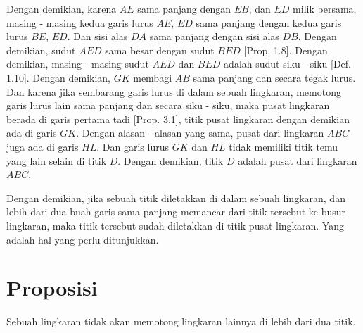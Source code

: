 \documentclass[a4paper]{book}
\begin{document}
Dengan demikian, karena $AE$ sama panjang dengan $EB$, dan $ED$ milik bersama, masing - 
masing kedua garis lurus $AE$, $ED$ sama panjang dengan kedua garis lurus $BE$,
$ED$. Dan sisi alas $DA$ sama panjang dengan sisi alas $DB$. Dengan demikian,
sudut $AED$ sama besar dengan sudut $BED$ [Prop. 1.8]. Dengan demikian, masing - masing sudut $AED$ dan $BED$ adalah sudut siku - siku [Def. 1.10]. Dengan 
demikian, $GK$ membagi $AB$ sama panjang dan secara tegak lurus. Dan karena
jika sembarang garis lurus di dalam sebuah lingkaran, memotong garis lurus lain
sama panjang dan secara siku - siku, maka pusat lingkaran berada di garis
pertama tadi [Prop. 3.1], titik pusat lingkaran dengan demikian ada di garis
$GK$.  Dengan alasan - alasan yang sama, pusat dari lingkaran $ABC$ juga ada di
garis $HL$. Dan garis lurus $GK$ dan $HL$ tidak memiliki titik temu yang lain
selain di titik $D$. Dengan demikian, titik $D$ adalah pusat dari lingkaran
$ABC$.

Dengan demikian, jika sebuah titik diletakkan di dalam sebuah lingkaran, dan
lebih dari dua buah garis sama panjang memancar dari titik tersebut ke busur
lingkaran, maka titik tersebut sudah diletakkan di titik pusat lingkaran. Yang
adalah hal yang perlu ditunjukkan.

\section*{\centering Proposisi \thesection}
Sebuah lingkaran tidak akan memotong lingkaran lainnya di lebih dari
dua titik.

\begin{center}
\end{center}
\end{document}

